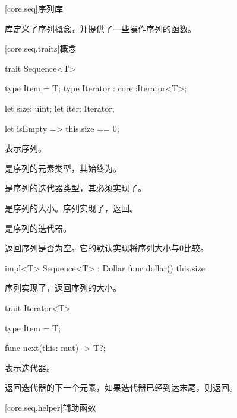 
[core.seq]{序列库}

\pnum
{}库定义了序列概念，并提供了一些操作序列的函数。

[core.seq.traits]{概念}

\begin{itemdecl}
trait Sequence<T> {
    type Item = T;
    type Iterator : core::Iterator<T>;

    let size: uint;
    let iter: Iterator;

    let isEmpty => this.size == 0;
}
\end{itemdecl}

\pnum
{}表示序列。

\pnum
{}是序列的元素类型，其始终为。

\pnum
{}是序列的迭代器类型，其必须实现了。

\pnum
{}是序列的大小。序列实现了，返回。

\pnum
{}是序列的迭代器。

\pnum
{}返回序列是否为空。它的默认实现将序列大小与0比较。

\begin{itemdecl}
impl<T> Sequence<T> : Dollar {
    func dollar() { this.size }
}
\end{itemdecl}

\pnum
序列实现了，返回序列的大小。

\begin{itemdecl}
trait Iterator<T> {
    type Item = T;

    func next(this: mut) -> T?;
}
\end{itemdecl}

\pnum
{}表示迭代器。

\pnum
{}返回迭代器的下一个元素，如果迭代器已经到达末尾，则返回。

[core.seq.helper]{辅助函数}
